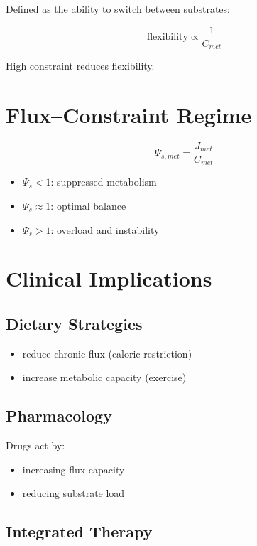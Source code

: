 \documentclass[12pt,a4paper]{article}
\begin{document}
Defined as the ability to switch between substrates:

\begin{equation}
\text{flexibility} \propto \frac{1}{C_{met}}
\end{equation}

High constraint reduces flexibility.

\section{Flux–Constraint Regime}

\begin{equation}
\Psi_{s,met} = \frac{J_{met}}{C_{met}}
\end{equation}

\begin{itemize}
    \item $\Psi_s < 1$: suppressed metabolism
    \item $\Psi_s \approx 1$: optimal balance
    \item $\Psi_s > 1$: overload and instability
\end{itemize}

\section{Clinical Implications}

\subsection{Dietary Strategies}

\begin{itemize}
    \item reduce chronic flux (caloric restriction)
    \item increase metabolic capacity (exercise)
\end{itemize}

\subsection{Pharmacology}

Drugs act by:

\begin{itemize}
    \item increasing flux capacity
    \item reducing substrate load
\end{itemize}

\subsection{Integrated Therapy}
\end{document}
